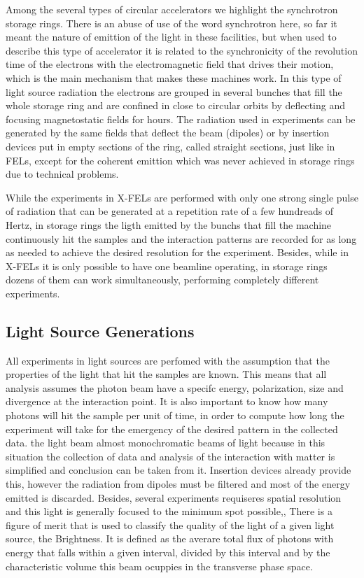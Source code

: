 \documentclass[
	12pt,				%
	openright,			%
	oneside,			%
	a4paper,		%
	chapter=TITLE,		%
	section=TITLE,		%
    brazil,				%
	english,			%
	sumario=tradicional,
	]{abntex2}
\begin{document}
    Among the several types of circular accelerators we highlight the synchrotron storage rings. There is an abuse of use of the word synchrotron here, so far it meant the nature of emittion of the light in these facilities, but when used to describe this type of accelerator it is related to the synchronicity of the revolution time of the electrons with the electromagnetic field that drives their motion, which is the main mechanism that makes these machines work. In this type of light source radiation the electrons are grouped in several bunches that fill the whole storage ring and are confined in close to circular orbits by deflecting and focusing magnetostatic fields for hours. The radiation used in experiments can be generated by the same fields that deflect the beam (dipoles) or by insertion devices put in empty sections of the ring, called straight sections, just like in FELs, except for the coherent emittion which was never achieved in storage rings due to technical problems.

    While the experiments in X-FELs are performed with only one strong single pulse of radiation that can be generated at a repetition rate of a few hundreads of Hertz, in storage rings the ligth emitted by the bunchs that fill the machine continuously hit the samples and the interaction patterns are recorded for as long as needed to achieve the desired resolution for the experiment. Besides, while in X-FELs it is only possible to have one beamline operating, in storage rings dozens of them can work simultaneously, performing completely different experiments.


    \subsection{Light Source Generations}

    All experiments in light sources are perfomed with the assumption that the properties of the light that hit the samples are known. This means that all analysis assumes the photon beam have a specifc energy, polarization, size and divergence at the interaction point. It is also important to know how many photons will hit the sample per unit of time, in order to compute how long the experiment will take for the emergency of the desired pattern in the collected data. the light beam  almost monochromatic beams of light because in this situation the collection of data and analysis of the interaction with matter is simplified and conclusion can be taken from it. Insertion devices already provide this, however the radiation from dipoles must be filtered and most of the energy emitted is discarded. Besides, several experiments requiseres spatial resolution and this light is generally focused to the minimum spot possible,,   There is a figure of merit that is used to classify the quality of the light of a given light source, the Brightness. It is defined as the averare total flux of photons with energy that falls within a given interval, divided by this interval and by the characteristic volume this beam ocuppies in the transverse phase space.
\end{document}
